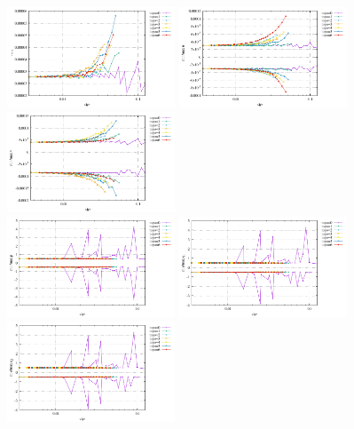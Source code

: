 \begin{center}
\includegraphics[width=5cm]{python_codes/fieldstone_78/results/vrms_exp2.pdf} 
\includegraphics[width=5cm]{python_codes/fieldstone_78/results/stats_u_exp2.pdf}
\includegraphics[width=5cm]{python_codes/fieldstone_78/results/stats_v_exp2.pdf}\\
\includegraphics[width=5cm]{python_codes/fieldstone_78/results/stats_p_exp2.pdf}
\includegraphics[width=5cm]{python_codes/fieldstone_78/results/stats_q1_exp2.pdf}
\includegraphics[width=5cm]{python_codes/fieldstone_78/results/stats_q2_exp2.pdf}
\end{center}


